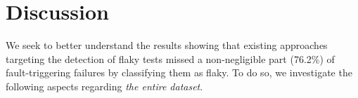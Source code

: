 \section{Discussion}
\label{sec:chromium-discussion}



We seek to better understand the results showing that existing approaches targeting the detection of flaky tests missed a non-negligible part (76.2\%) of fault-triggering failures by classifying them as flaky. To do so, we investigate the following aspects regarding \textit{the entire dataset}.

